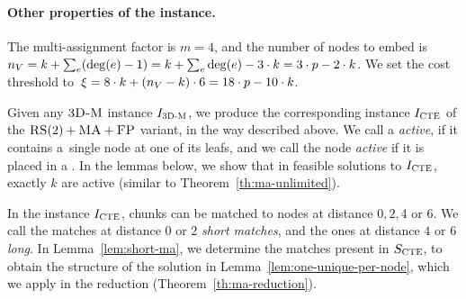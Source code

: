\paragraph{Other properties of the instance.}
The multi-assignment factor is $m=4$, and the number of nodes to embed is~$n_V = k + \sum_{e}(\deg(e)-1) = k + \sum_{e}\deg(e)-3\cdot k = 3\cdot p - 2\cdot k$.
 We set the cost threshold to~$\xi = 8\cdot k + (n_V-k)\cdot 6 = 18\cdot p - 10\cdot k$.


 \bigskip
 
Given any $\textsc{3D-M}$ instance $I_{\mathrm{\textsc{3D-M}}}$, we produce the corresponding instance $I_{\mathrm{\textsc{CTE}}}$ of the $\textsc{RS}(2)+\textsc{MA}+\textsc{FP}$ variant, in the way described above.
We call a {\TripleGadget} \textit{active}, if it contains a~single node at one of its leafs, and we call the node \textit{active} if it is placed in a {\TripleGadget}.
In the lemmas below, we show that in feasible solutions to $I_{\mathrm{\textsc{CTE}}}$, exactly $k$ \TripleGadgets{} are active (similar to Theorem~\ref{th:ma-unlimited}).

In the instance $I_{\mathrm{\textsc{CTE}}}$, chunks can be matched to nodes at distance $0, 2, 4$ or $6$.
We call the matches at distance $0$ or $2$ \emph{short matches}, and the ones at distance $4$ or $6$ \emph{long}.
In Lemma~\ref{lem:short-ma}, we determine the matches present in $S_{\mathrm{\textsc{CTE}}}$, to obtain the structure of the solution in Lemma~\ref{lem:one-unique-per-node}, which we apply in the reduction (Theorem~\ref{th:ma-reduction}).

